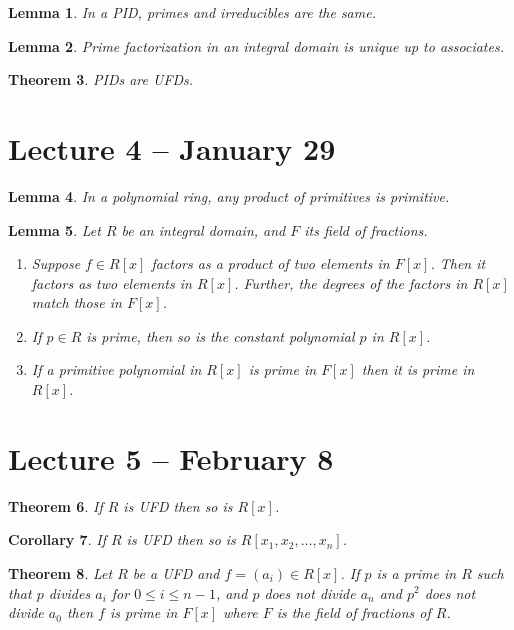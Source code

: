 \documentclass[letterpaper]{article}
\newtheorem{theorem}{Theorem}[section]
\newtheorem{lemma}[theorem]{Lemma}
\newtheorem{corollary}[theorem]{Corollary}
\begin{document}
\begin{lemma}
In a PID, primes and irreducibles are the same.
\end{lemma}

\begin{lemma}
Prime factorization in an integral domain is unique up to associates.
\end{lemma}

\begin{theorem}
PIDs are UFDs.
\end{theorem}

\section{Lecture 4 -- January 29}

\begin{lemma}
In a polynomial ring, any product of primitives is primitive.
\end{lemma}

\begin{lemma}
Let $R$ be an integral domain, and $F$ its field of fractions.
\begin{enumerate}
\item Suppose $f \in R[x]$ factors as a product of two elements in $F[x]$. Then it factors as two  elements in $R[x]$. Further, the degrees of the factors in $R[x]$ match those in $F[x]$.
\item If $p \in R$ is prime, then so is the constant polynomial $p$ in $R[x]$.
\item If a primitive polynomial in $R[x]$ is prime in $F[x]$ then it is prime in $R[x]$.
\end{enumerate}
\end{lemma}

\section{Lecture 5 -- February 8}

\begin{theorem}
If $R$ is UFD then so is $R[x]$.
\end{theorem}

\begin{corollary}
If $R$ is UFD then so is $R[x_1, x_2, \ldots, x_n]$.
\end{corollary}

\begin{theorem}
Let $R$ be a UFD and $f = (a_i) \in R[x]$. If $p$ is a prime in $R$ such that $p$ divides $a_i$ for $0 \leq i \leq n-1$, and $p$ does not divide $a_n$ and $p^2$ does not divide $a_0$ then $f$ is prime in $F[x]$ where $F$ is the field of fractions of $R$.
\end{theorem}
\end{document}
